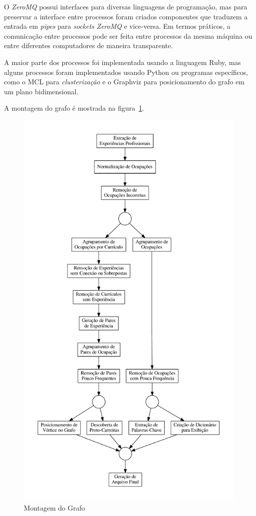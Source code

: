 \documentclass[12pt,a4paper]{article}
\theoremstyle{hypo}
\begin{document}
O \textit{ZeroMQ} possui interfaces para diversas linguagens de programação, mas para preservar a interface entre processos foram criados componentes que traduzem a entrada em \textit{pipes} para \textit{sockets ZeroMQ} e vice-versa. Em termos práticos, a comunicação entre processos pode ser feita entre processos da mesma máquina ou entre diferentes computadores de maneira transparente.

A maior parte dos processos foi implementada usando a linguagem Ruby, mas alguns processos foram implementados usando Python ou programas específicos, como o MCL para \textit{clusterização} e o Graphviz para posicionamento do grafo em um plano bidimensional.

A montagem do grafo é mostrada na figura~\ref{fig:montagem-do-grafo}.

\begin{figure}[ht]
  \centering
  \includegraphics[scale=0.4]{pipeline1.pdf}
  \caption{Montagem do Grafo}
  \label{fig:montagem-do-grafo}
\end{figure}
\end{document}
